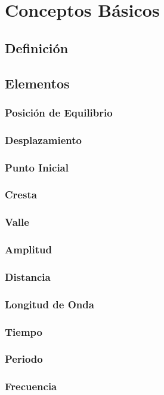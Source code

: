 \chapter{Conceptos Básicos}%
\section{Definición}%

\section{Elementos}

\subsection{Posición de Equilibrio}

\subsection{Desplazamiento}

\subsection{Punto Inicial}

\subsection{Cresta}

\subsection{Valle}

\subsection{Amplitud}

\subsection{Distancia}

\subsection{Longitud de Onda}

\subsection{Tiempo}

\subsection{Periodo}

\subsection{Frecuencia}

